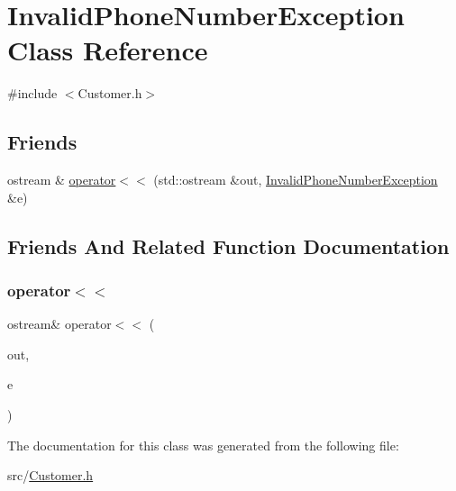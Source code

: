\hypertarget{classInvalidPhoneNumberException}{}\section{Invalid\+Phone\+Number\+Exception Class Reference}
\label{classInvalidPhoneNumberException}


{\ttfamily \#include $<$Customer.\+h$>$}

\subsection*{Friends}
\begin{DoxyCompactItemize}
\item 
ostream \& \hyperlink{classInvalidPhoneNumberException_a1c94662607a7a713e37b83a24cff101b}{operator$<$$<$} (std\+::ostream \&out, \hyperlink{classInvalidPhoneNumberException}{Invalid\+Phone\+Number\+Exception} \&e)
\end{DoxyCompactItemize}


\subsection{Friends And Related Function Documentation}
\hypertarget{classInvalidPhoneNumberException_a1c94662607a7a713e37b83a24cff101b}{}\label{classInvalidPhoneNumberException_a1c94662607a7a713e37b83a24cff101b} 
\subsubsection{\texorpdfstring{operator$<$$<$}{operator<<}}
{\footnotesize\ttfamily ostream\& operator$<$$<$ (\begin{DoxyParamCaption}\item[{std\+::ostream \&}]{out,  }\item[{\hyperlink{classInvalidPhoneNumberException}{Invalid\+Phone\+Number\+Exception} \&}]{e }\end{DoxyParamCaption})\hspace{0.3cm}{\ttfamily [friend]}}



The documentation for this class was generated from the following file\+:\begin{DoxyCompactItemize}
\item 
src/\hyperlink{Customer_8h}{Customer.\+h}\end{DoxyCompactItemize}

